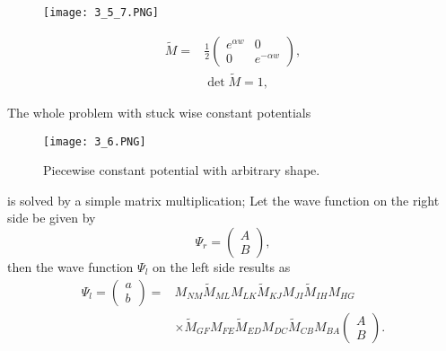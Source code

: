 \begin{figure}[ht]
    \begin{minipage}{0.5\textwidth}
        \centering
        \texttt{[image: 3\_5\_7.PNG]}
    \end{minipage}
    \begin{minipage}{0.5\textwidth}
        \begin{equation}
            \begin{aligned}
                \widetilde{M} = &\frac{1}{2}\left(\begin{array}{cc}{e^{\alpha w}} & {0}\\{0}&{e^{-\alpha w}}
                \end{array}\right),
                \\& \operatorname{det}\widetilde{M}=1,
            \end{aligned}
        \end{equation}
    \end{minipage}
\end{figure}
The whole problem with stuck wise constant potentials
\begin{figure}[ht]
    \centering
    \texttt{[image: 3\_6.PNG]}
    \caption{Piecewise constant potential with arbitrary shape.}
\end{figure}
is solved by a simple matrix multiplication; Let the wave function on the right side be given by
\begin{equation}
\Psi_r=\left(\begin{array}{cc}{A}\\{B}\end{array}\right),
\end{equation}
then the wave function $Ψ_l$ on the left side results as
\begin{equation}
    \begin{aligned}
        \Psi_l = \left(\begin{array}{cc}
            {a}\\{b}
        \end{array}\right)=&M_{NM}\widetilde{M}_{ML}M_{LK}\widetilde{M}_{KJ}M_{JI}\widetilde{M}_{IH}M_{HG}\\
        &\times \widetilde{M}_{GF}M_{FE}\widetilde{M}_{ED}M_{DC}\widetilde{M}_{CB}M_{BA}\left(\begin{array}{cc}
            {A}\\{B}
        \end{array}\right).
    \end{aligned}
\end{equation}

